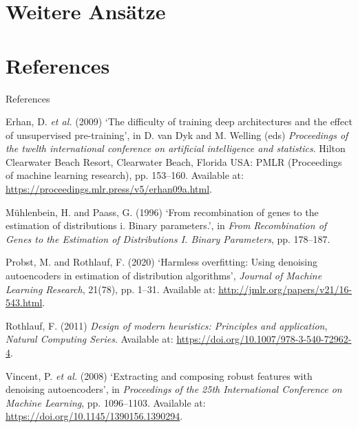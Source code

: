 \documentclass[
  ignorenonframetext,
]{beamer}
\newlength{\cslhangindent}
\newlength{\cslentryspacingunit} %
\newenvironment{CSLReferences}[2] %
 {%
  \setlength{\parindent}{0pt}
  \ifodd #1
  \let\oldpar\par
  \def\par{\hangindent=\cslhangindent\oldpar}
  \fi
  \setlength{\parskip}{#2\cslentryspacingunit}
 }%
 {}
\begin{document}
\hypertarget{weitere-ansuxe4tze}{%
\section{Weitere Ansätze}\label{weitere-ansuxe4tze}}

\hypertarget{references}{%
\section*{References}\label{references}}

\begin{frame}[allowframebreaks]{References}
\hypertarget{refs}{}
\begin{CSLReferences}{0}{0}
\leavevmode{}%
Erhan, D. \emph{et al.} (2009) {`The difficulty of training deep
architectures and the effect of unsupervised pre-training'}, in D. van
Dyk and M. Welling (eds) \emph{Proceedings of the twelth international
conference on artificial intelligence and statistics}. Hilton Clearwater
Beach Resort, Clearwater Beach, Florida USA: PMLR (Proceedings of
machine learning research), pp. 153--160. Available at:
\url{https://proceedings.mlr.press/v5/erhan09a.html}.

\leavevmode{}%
Mühlenbein, H. and Paass, G. (1996) {`From recombination of genes to the
estimation of distributions i. Binary parameters.'}, in \emph{From
Recombination of Genes to the Estimation of Distributions I. Binary
Parameters}, pp. 178--187.

\leavevmode{}%
Probst, M. and Rothlauf, F. (2020) {`Harmless overfitting: Using
denoising autoencoders in estimation of distribution algorithms'},
\emph{Journal of Machine Learning Research}, 21(78), pp. 1--31.
Available at: \url{http://jmlr.org/papers/v21/16-543.html}.

\leavevmode{}%
Rothlauf, F. (2011) \emph{Design of modern heuristics: Principles and
application}, \emph{Natural Computing Series}. Available at:
\url{https://doi.org/10.1007/978-3-540-72962-4}.

\leavevmode{}%
Vincent, P. \emph{et al.} (2008) {`Extracting and composing robust
features with denoising autoencoders'}, in \emph{Proceedings of the 25th
International Conference on Machine Learning}, pp. 1096--1103. Available
at: \url{https://doi.org/10.1145/1390156.1390294}.


\end{CSLReferences}
\end{frame}
\end{document}
